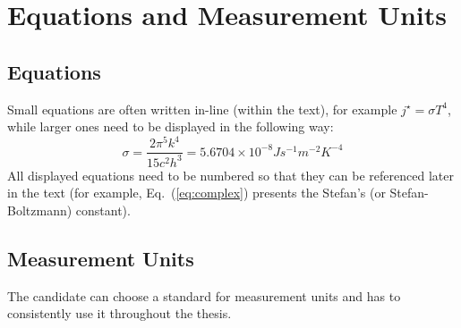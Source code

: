 % 
\chapter{Equations and Measurement Units}

\section{Equations}

Small equations are often written in-line (within the text), for example $j^\star = \sigma T^4$, while larger ones need to be displayed in the following way:
\begin{equation}
	\sigma = \frac{2 \pi^5 k^4}{15 c^2 h^3} = 5.6704 \times 10^{-8} J s^{-1} m^{-2} K^{-4}
	\label{eq:complex}
\end{equation}
All displayed equations need to be numbered so that they can be referenced later in the text (for example, Eq.~(\ref{eq:complex}) presents the Stefan's (or Stefan-Boltzmann) constant).

\section{Measurement Units}

The candidate can choose a standard for measurement units and has to consistently use it throughout the thesis. 